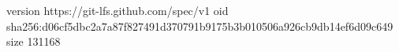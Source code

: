 version https://git-lfs.github.com/spec/v1
oid sha256:d06cf5dbc2a7a87f827491d370791b9175b3b010506a926cb9db14ef6d09c649
size 131168
